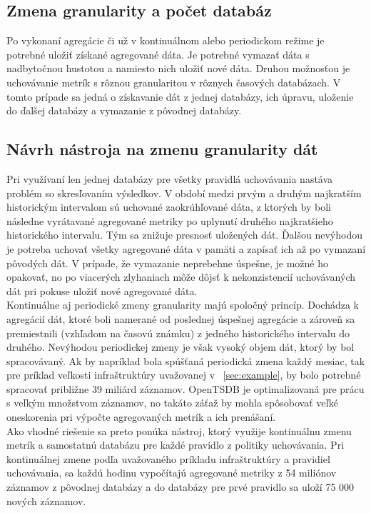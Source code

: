 \documentclass[printed,11pt,twoside,color,cover,table]{fithesis3}
\begin{document}
\subsection{Zmena granularity a počet databáz}
Po vykonaní agregácie či už v kontinuálnom alebo periodickom režime je potrebné uložiť získané agregované dáta. Je potrebné vymazať dáta s nadbytočnou hustotou a namiesto nich uložiť nové dáta.
Druhou možnosťou je uchovávanie metrík s rôznou granularitou v rôznych časových databázach. V tomto prípade sa jedná o získavanie dát z jednej databázy, ich úpravu, uloženie do ďalšej databázy a vymazanie 
z pôvodnej databázy.

\subsection{Návrh nástroja na zmenu granularity dát}
Pri využívaní len jednej databázy pre všetky pravidlá uchovávania nastáva problém so skresľovaním výsledkov. V období medzi prvým a druhým najkratším historickým intervalom sú uchované zaokrúhľované dáta,
z ktorých by boli následne vyrátavané agregované metriky po uplynutí druhého najkratšieho historického intervalu. Tým sa znižuje presnosť uložených dát. Ďalšou nevýhodou je potreba uchovať všetky agregované 
dáta v pamäti a zapísať ich až po vymazaní pôvodých dát. V prípade, že vymazanie neprebehne úspešne, je možné ho opakovať, no po viacerých zlyhaniach môže dôjsť k nekonzistencií uchovávaných dát pri pokuse uložiť 
nové agregované dáta.
\\Kontinuálne aj periodické zmeny granularity majú spoločný princíp. Dochádza k agregácií dát, ktoré boli namerané od poslednej úspešnej agregácie a zároveň sa premiestnili (vzhľadom na časovú známku) z jedného
historického intervalu do druhého. Nevýhodou periodickej zmeny je však vysoký objem dát, ktorý by bol spracovávaný. Ak by napríklad bola spúšťaná periodická zmena každý mesiac, tak pre príklad veľkosti 
infraštruktúry uvažovanej v ~\ref{sec:example}, by bolo potrebné spracovať približne 39 miliárd záznamov. OpenTSDB je optimalizovaná pre prácu s veľkým množstvom záznamov, no takáto záťaž by mohla spôsobovať 
veľké oneskorenia pri výpočte agregovaných metrík a ich prenášaní.
\\Ako vhodné riešenie sa preto ponúka nástroj, ktorý využije kontinuálnu zmenu metrík a samostatnú databázu pre každé pravidlo z politiky uchovávania. Pri kontinuálnej zmene podľa uvažovaného príkladu 
infraštruktúry a pravidiel uchovávania, sa každú hodinu vypočítajú agregované metriky z 54 miliónov záznamov z pôvodnej databázy a do databázy pre prvé pravidlo sa uloží 75 000 nových záznamov. 
\end{document}
